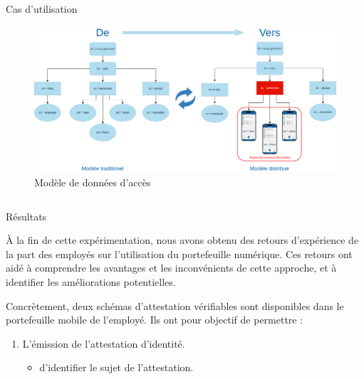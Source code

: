 \documentclass[final]{beamer}
\newlength{\onecolwid}
\newlength{\twocolwid}
\begin{document}
\begin{frame}[t]
\begin{columns}[t]
\begin{column}{\twocolwid}
\begin{alertblock}{Cas d'utilisation}
\end{alertblock} 

\begin{figure}
\includegraphics[width=0.9\linewidth]{Port-E-LDAP.png}
\caption{ Modèle de données d'accès}
\end{figure}


\begin{columns}[t,totalwidth=\twocolwid] %

\begin{column}{\onecolwid} %



\begin{block}{Résultats}

À la fin de cette expérimentation, nous avons obtenu des retours d'expérience de la part des employés sur l'utilisation du portefeuille numérique. Ces retours ont aidé à comprendre les avantages et les inconvénients de cette approche, et à identifier les améliorations potentielles.

Concrètement, deux schémas d'attestation vérifiables sont disponibles dans le portefeuille mobile de l'employé. Ils ont pour objectif de permettre :

\begin{enumerate}
\item L'émission de l'attestation d'identité.
    \begin{itemize}
        \item d'identifier le sujet de l'attestation.
    \end{itemize}


\end{enumerate}
\end{block}
\end{column}
\end{columns}
\end{column}
\end{columns}
\end{frame}
\end{document}
